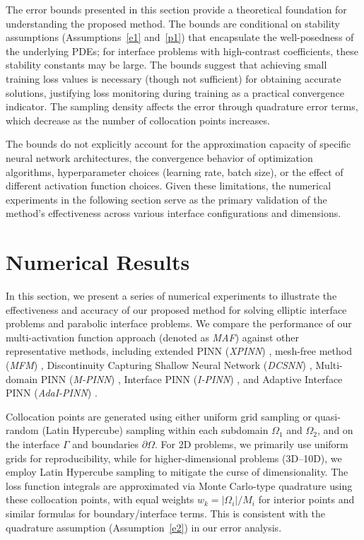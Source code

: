 \documentclass{article}
\begin{document}
The error bounds presented in this section provide a theoretical foundation for understanding the proposed method. The bounds are conditional on stability assumptions (Assumptions~\ref{e1} and~\ref{p1}) that encapsulate the well-posedness of the underlying PDEs; for interface problems with high-contrast coefficients, these stability constants may be large. The bounds suggest that achieving small training loss values is necessary (though not sufficient) for obtaining accurate solutions, justifying loss monitoring during training as a practical convergence indicator. The sampling density affects the error through quadrature error terms, which decrease as the number of collocation points increases.

The bounds do not explicitly account for the approximation capacity of specific neural network architectures, the convergence behavior of optimization algorithms, hyperparameter choices (learning rate, batch size), or the effect of different activation function choices. Given these limitations, the numerical experiments in the following section serve as the primary validation of the method's effectiveness across various interface configurations and dimensions.



\section{Numerical Results}
\label{NumericalResults}
\noindent
In this section, we present a series of numerical experiments to illustrate the effectiveness and accuracy of our proposed method for solving elliptic interface problems and parabolic interface problems. We compare the performance of our multi-activation function approach (denoted as \emph{MAF}) against other representative methods, including extended PINN (\emph{XPINN}) \cite{jagtap2020extended}, mesh-free method (\emph{MFM}) \cite{he2022mesh}, Discontinuity Capturing Shallow Neural Network (\emph{DCSNN}) \cite{hu2022discontinuity}, Multi-domain PINN (\emph{M-PINN}) \cite{zhang2022multi}, Interface PINN (\emph{I-PINN}) \cite{sarma2024interface}, and Adaptive Interface PINN (\emph{AdaI-PINN}) \cite{roy2024adaptive}.

Collocation points are generated using either uniform grid sampling or quasi-random (Latin Hypercube) sampling within each subdomain $\Omega_1$ and $\Omega_2$, and on the interface $\Gamma$ and boundaries $\partial\Omega$. For 2D problems, we primarily use uniform grids for reproducibility, while for higher-dimensional problems (3D--10D), we employ Latin Hypercube sampling to mitigate the curse of dimensionality. The loss function integrals are approximated via Monte Carlo-type quadrature using these collocation points, with equal weights $w_k = |\Omega_i|/M_i$ for interior points and similar formulas for boundary/interface terms. This is consistent with the quadrature assumption (Assumption~\ref{e2}) in our error analysis.
\end{document}
